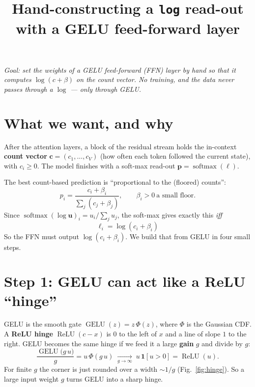 \documentclass[11pt]{article}
\title{\textbf{Hand-constructing a \texttt{log} read-out with a GELU feed-forward layer}}
\author{}
\date{}
\newcommand{\relu}{\operatorname{ReLU}}
\newcommand{\gelu}{\operatorname{GELU}}
\newcommand{\sm}{\operatorname{softmax}}
\begin{document}
\maketitle
\vspace{-3em}

\noindent
\textit{Goal: set the weights of a GELU feed-forward (FFN) layer \emph{by hand} so that it
computes $\log(c+\beta)$ on the count vector. No training, and the data never passes
through a $\log$ --- only through GELU.}

\section{What we want, and why}

After the attention layers, a block of the residual stream holds the in-context
\textbf{count vector} $\mathbf c=(c_1,\dots,c_V)$ (how often each token followed the
current state), with $c_i\ge 0$. The model finishes with a soft-max read-out
$\mathbf p=\sm(\boldsymbol\ell)$.

The best count-based prediction is ``proportional to the (floored) counts'':
\[
p_i=\frac{c_i+\beta_i}{\sum_j(c_j+\beta_j)},\qquad \beta_i>0\ \text{a small floor.}
\]
Since $\sm(\log\mathbf u)_i=u_i/\sum_j u_j$, the soft-max gives exactly this \emph{iff}
\begin{equation}\label{eq:goal}
\boxed{\;\ell_i=\log(c_i+\beta_i)\;}
\end{equation}
So the FFN must output $\log(c_i+\beta_i)$. We build that from GELU in four small steps.

\section{Step 1: GELU can act like a ReLU ``hinge''}

GELU is the smooth gate $\gelu(z)=z\,\Phi(z)$, where $\Phi$ is the Gaussian CDF.
A \textbf{ReLU hinge} $\relu(c-x)$ is $0$ to the left of $x$ and a line of slope $1$ to
the right. GELU becomes the same hinge if we feed it a large \textbf{gain} $g$ and divide by $g$:
\begin{equation}\label{eq:gain}
\frac{\gelu\!\big(g\,u\big)}{g}=u\,\Phi(g\,u)\;\xrightarrow[g\to\infty]{}\;u\,\mathbf 1[u>0]=\relu(u).
\end{equation}
For finite $g$ the corner is just rounded over a width $\sim 1/g$ (Fig.~\ref{fig:hinge}).
So a large input weight $g$ turns GELU into a sharp hinge.
\end{document}
